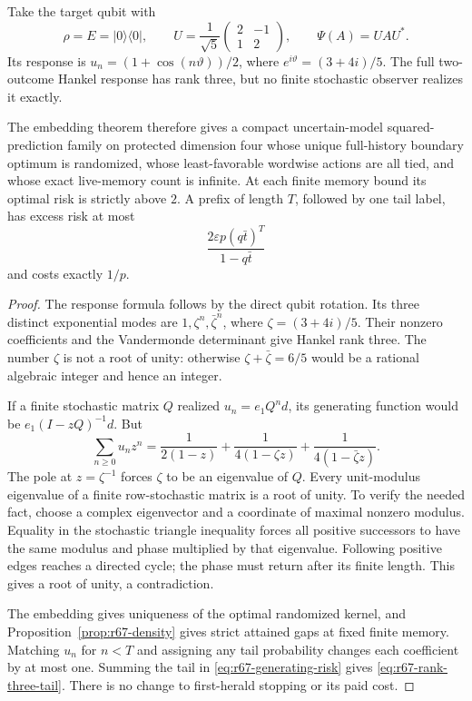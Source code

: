 \begin{theorem}\label{thm:r67-rank-three}
Take the target qubit with
\[
 \rho=E=|0\rangle\langle0|,\qquad
 U=\frac1{\sqrt5}\begin{pmatrix}2&-1\\1&2\end{pmatrix},
 \qquad\Psi(A)=UAU^*.
\]
Its response is $u_n=(1+\cos(n\vartheta))/2$, where $e^{i\vartheta}=(3+4i)/5$. The full two-outcome Hankel response has rank three, but no finite stochastic observer realizes it exactly.

The embedding theorem therefore gives a compact uncertain-model squared-prediction family on protected dimension four whose unique full-history boundary optimum is randomized, whose least-favorable wordwise actions are all tied, and whose exact live-memory count is infinite. At each finite memory bound its optimal risk is strictly above $2$. A prefix of length $T$, followed by one tail label, has excess risk at most
\begin{equation}\label{eq:r67-rank-three-tail}
 \frac{2\varepsilon p(q\bar t)^T}{1-q\bar t}
\end{equation}
and costs exactly $1/p$.
\end{theorem}
\begin{proof}
The response formula follows by the direct qubit rotation. Its three distinct exponential modes are $1,\zeta^n,\bar\zeta^n$, where $\zeta=(3+4i)/5$. Their nonzero coefficients and the Vandermonde determinant give Hankel rank three. The number $\zeta$ is not a root of unity: otherwise $\zeta+\bar\zeta=6/5$ would be a rational algebraic integer and hence an integer.

If a finite stochastic matrix $Q$ realized $u_n=e_1Q^nd$, its generating function would be $e_1(I-zQ)^{-1}d$. But
\[
 \sum_{n\ge0}u_nz^n=
 \frac1{2(1-z)}+\frac1{4(1-\zeta z)}+
                         \frac1{4(1-\bar\zeta z)}.
\]
The pole at $z=\zeta^{-1}$ forces $\zeta$ to be an eigenvalue of $Q$. Every unit-modulus eigenvalue of a finite row-stochastic matrix is a root of unity. To verify the needed fact, choose a complex eigenvector and a coordinate of maximal nonzero modulus. Equality in the stochastic triangle inequality forces all positive successors to have the same modulus and phase multiplied by that eigenvalue. Following positive edges reaches a directed cycle; the phase must return after its finite length. This gives a root of unity, a contradiction.

The embedding gives uniqueness of the optimal randomized kernel, and Proposition~\ref{prop:r67-density} gives strict attained gaps at fixed finite memory. Matching $u_n$ for $n<T$ and assigning any tail probability changes each coefficient by at most one. Summing the tail in \eqref{eq:r67-generating-risk} gives \eqref{eq:r67-rank-three-tail}. There is no change to first-herald stopping or its paid cost.
\end{proof}

